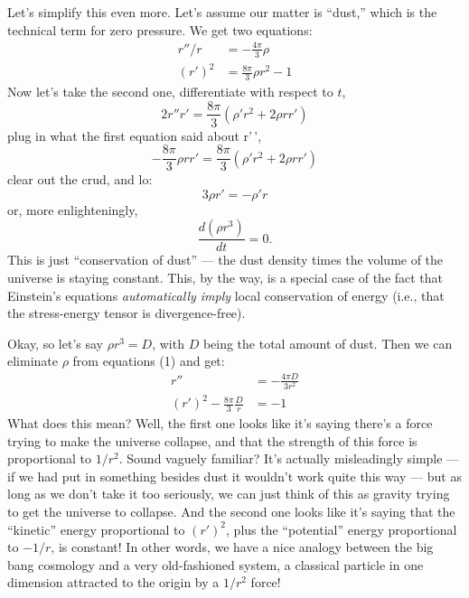 \documentclass{article}
\begin{document}
Let's simplify this even more. Let's assume our matter is ``dust,''
which is the technical term for zero pressure. We get two equations:
\[\begin{aligned}r''/r &= -\frac{4\pi}{3}\rho \\ (r')^2 &= \frac{8\pi}{3}\rho r^2-1\end{aligned}\tag{1}\]
Now let's take the second one, differentiate with respect to \(t\),
\[2r''r' = \frac{8\pi}{3}(\rho'r^2 + 2 \rho r r')\] plug in what the
first equation said about r'\,',
\[-\frac{8\pi}{3} \rho r r' = \frac{8\pi}{3}(\rho' r^2 + 2 \rho r r')\]
clear out the crud, and lo: \[3 \rho r' = -\rho' r\] or, more
enlighteningly, \[\frac{d(\rho r^3)}{dt} = 0.\] This is just
``conservation of dust'' --- the dust density times the volume of the
universe is staying constant. This, by the way, is a special case of the
fact that Einstein's equations \emph{automatically imply} local
conservation of energy (i.e., that the stress-energy tensor is
divergence-free).

Okay, so let's say \(\rho r^3 = D\), with \(D\) being the total amount
of dust. Then we can eliminate \(\rho\) from equations (1) and get:
\[\begin{aligned}r'' &= -\frac{4\pi D}{3r^2} \\ (r')^2-\frac{8\pi}{3}\frac{D}{r} &= -1 \end{aligned}\tag{2}\]
What does this mean? Well, the first one looks like it's saying there's
a force trying to make the universe collapse, and that the strength of
this force is proportional to \(1/r^2\). Sound vaguely familiar? It's
actually misleadingly simple --- if we had put in something besides dust
it wouldn't work quite this way --- but as long as we don't take it too
seriously, we can just think of this as gravity trying to get the
universe to collapse. And the second one looks like it's saying that the
``kinetic'' energy proportional to \((r')^2\), plus the ``potential''
energy proportional to \(-1/r\), is constant! In other words, we have a
nice analogy between the big bang cosmology and a very old-fashioned
system, a classical particle in one dimension attracted to the origin by
a \(1/r^2\) force!
\end{document}

